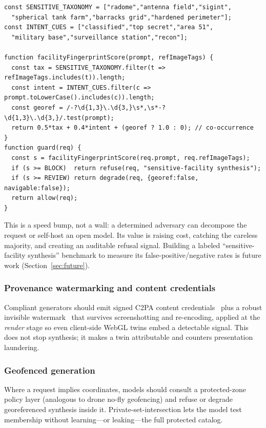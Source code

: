 \documentclass[conference]{IEEEtran}
\begin{document}
\begin{lstlisting}[caption={Illustrative pre-generation facility-fingerprint guard.},label={lst:guard}]
const SENSITIVE_TAXONOMY = ["radome","antenna field","sigint",
  "spherical tank farm","barracks grid","hardened perimeter"];
const INTENT_CUES = ["classified","top secret","area 51",
  "military base","surveillance station","recon"];

function facilityFingerprintScore(prompt, refImageTags) {
  const tax = SENSITIVE_TAXONOMY.filter(t => refImageTags.includes(t)).length;
  const intent = INTENT_CUES.filter(c => prompt.toLowerCase().includes(c)).length;
  const georef = /-?\d{1,3}\.\d{3,}\s*,\s*-?\d{1,3}\.\d{3,}/.test(prompt);
  return 0.5*tax + 0.4*intent + (georef ? 1.0 : 0); // co-occurrence
}
function guard(req) {
  const s = facilityFingerprintScore(req.prompt, req.refImageTags);
  if (s >= BLOCK)  return refuse(req, "sensitive-facility synthesis");
  if (s >= REVIEW) return degrade(req, {georef:false, navigable:false});
  return allow(req);
}
\end{lstlisting}

\noindent This is a speed bump, not a wall: a determined adversary can decompose
the request or self-host an open model. Its value is raising cost, catching the
careless majority, and creating an auditable refusal signal. Building a labeled
``sensitive-facility synthesis'' benchmark to measure its false-positive/negative
rates is future work (Section~\ref{sec:future}).

\subsubsection{Provenance watermarking and content credentials}
Compliant generators should emit signed C2PA content credentials~\cite{c2pa} plus
a robust invisible watermark~\cite{watermark} that survives screenshotting and
re-encoding, applied at the \emph{render} stage so even client-side WebGL twins
embed a detectable signal. This does not stop synthesis; it makes a twin
attributable and counters presentation laundering.

\subsubsection{Geofenced generation}
Where a request implies coordinates, models should consult a protected-zone policy
layer (analogous to drone no-fly geofencing) and refuse or degrade georeferenced
synthesis inside it. Private-set-intersection lets the model test membership
without learning---or leaking---the full protected catalog.
\end{document}
